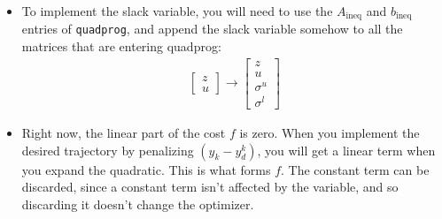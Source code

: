 \documentclass[12pt, onecolumn, a4paper]{exam}
\begin{document}
\begin{questions}
\begin{parts}
\begin{itemize}
\begin{align}
\begin{bmatrix}
            \end{bmatrix} 
          \end{align}
          The point of $\sigma_i^{l,u}$ is that it is always zero, except when $z_k$ is close to the boundary. Then, if $z_k$ goes over the boundary, instead of the problem becoming infeasable, the system accrues some slack variable penalty. Therefore, you should also introduce an appropriate quadratic penalty on $\sigma$.
        \item To implement the slack variable, you will need to use the $A_{\text{ineq}}$ and $b_{\text{ineq}}$ entries of \texttt{quadprog}, and append the slack variable somehow to all the matrices that are entering quadprog:
          \begin{align}
            \begin{bmatrix}
              z \\ u
            \end{bmatrix} \longrightarrow
            \begin{bmatrix}
              z \\ u \\ \sigma^u \\ \sigma^l
            \end{bmatrix}
          \end{align}
        \item Right now, the linear part of the cost $f$ is zero. When you implement the desired trajectory by penalizing $(y_k-y_d^k)$, you will get a linear term when you expand the quadratic. This is what forms $f$. The constant term can be discarded, since a constant term isn't affected by the variable, and so discarding it doesn't change the optimizer.
      \end{itemize}
  \end{parts}

\begin{solution}
  \begin{parts}

\end{parts}
\end{solution}
\end{questions}
\end{document}
